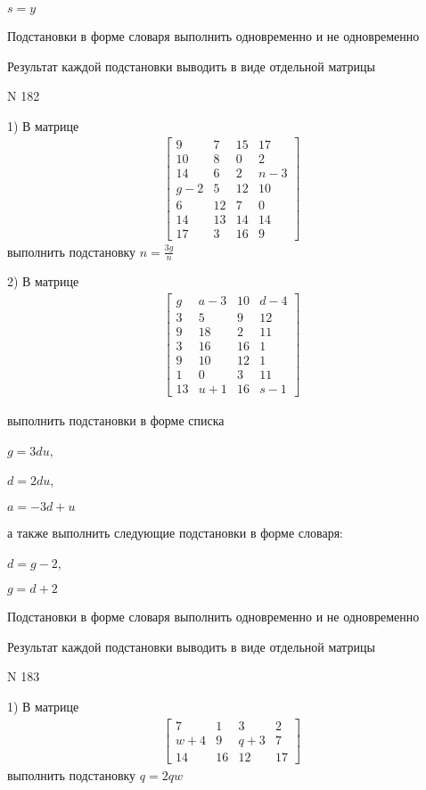 \documentclass[11pt]{report}
\begin{document}
$s=y$


    Подстановки в форме словаря выполнить одновременно и не одновременно


    Результат каждой подстановки выводить в виде отдельной матрицы

\newpage
N 182


    1) В матрице
\begin{align*}
\left[\begin{matrix}9 & 7 & 15 & 17\\10 & 8 & 0 & 2\\14 & 6 & 2 & n - 3\\g - 2 & 5 & 12 & 10\\6 & 12 & 7 & 0\\14 & 13 & 14 & 14\\17 & 3 & 16 & 9\end{matrix}\right]
\end{align*}
выполнить подстановку $n=\frac{3 g}{n}$


    2) В матрице
\begin{align*}
\left[\begin{matrix}g & a - 3 & 10 & d - 4\\3 & 5 & 9 & 12\\9 & 18 & 2 & 11\\3 & 16 & 16 & 1\\9 & 10 & 12 & 1\\1 & 0 & 3 & 11\\13 & u + 1 & 16 & s - 1\end{matrix}\right]
\end{align*}

выполнить подстановки в форме списка

$g=3 d u$,

$d=2 d u$,

$a=- 3 d + u$

а также выполнить следующие подстановки в форме словаря:

$d=g - 2$,

$g=d + 2$


    Подстановки в форме словаря выполнить одновременно и не одновременно


    Результат каждой подстановки выводить в виде отдельной матрицы

\newpage
N 183


    1) В матрице
\begin{align*}
\left[\begin{matrix}7 & 1 & 3 & 2\\w + 4 & 9 & q + 3 & 7\\14 & 16 & 12 & 17\end{matrix}\right]
\end{align*}
выполнить подстановку $q=2 q w$
\end{document}
